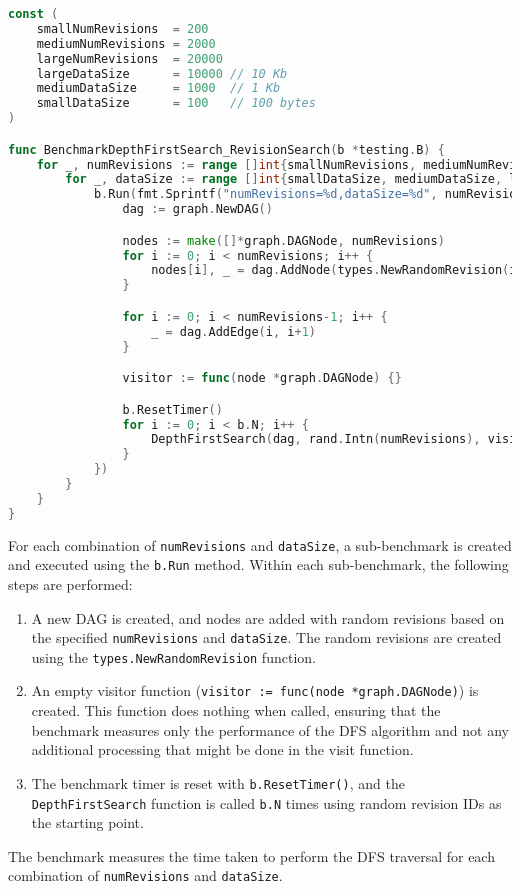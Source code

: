 \begin{lstlisting}[language=go]
const (
	smallNumRevisions  = 200
	mediumNumRevisions = 2000
	largeNumRevisions  = 20000
	largeDataSize      = 10000 // 10 Kb
	mediumDataSize     = 1000  // 1 Kb
	smallDataSize      = 100   // 100 bytes
)

func BenchmarkDepthFirstSearch_RevisionSearch(b *testing.B) {
	for _, numRevisions := range []int{smallNumRevisions, mediumNumRevisions, largeNumRevisions} {
		for _, dataSize := range []int{smallDataSize, mediumDataSize, largeDataSize} {
			b.Run(fmt.Sprintf("numRevisions=%d,dataSize=%d", numRevisions, dataSize), func(b *testing.B) {
				dag := graph.NewDAG()

				nodes := make([]*graph.DAGNode, numRevisions)
				for i := 0; i < numRevisions; i++ {
					nodes[i], _ = dag.AddNode(types.NewRandomRevision(i, dataSize))
				}

				for i := 0; i < numRevisions-1; i++ {
					_ = dag.AddEdge(i, i+1)
				}

				visitor := func(node *graph.DAGNode) {}

				b.ResetTimer()
				for i := 0; i < b.N; i++ {
					DepthFirstSearch(dag, rand.Intn(numRevisions), visitor)
				}
			})
		}
	}
}
\end{lstlisting}
\medskip

For each combination of \lstinline{numRevisions} and \lstinline{dataSize}, a sub-benchmark is created and executed using the \lstinline{b.Run} method. Within each sub-benchmark, the following steps are performed:
\begin{enumerate}
    \item A new DAG is created, and nodes are added with random revisions based on the specified \lstinline{numRevisions} and \lstinline{dataSize}. The random revisions are created using the \lstinline{types.NewRandomRevision} function.
    \item An empty visitor function (\lstinline{visitor := func(node *graph.DAGNode)}) is created. This function does nothing when called, ensuring that the benchmark measures only the performance of the DFS algorithm and not any additional processing that might be done in the visit function.
    \item The benchmark timer is reset with \lstinline{b.ResetTimer()}, and the \lstinline{DepthFirstSearch} function is called \lstinline{b.N} times using random revision IDs as the starting point.
\end{enumerate}
The benchmark measures the time taken to perform the DFS traversal for each combination of \lstinline{numRevisions} and \lstinline{dataSize}.

